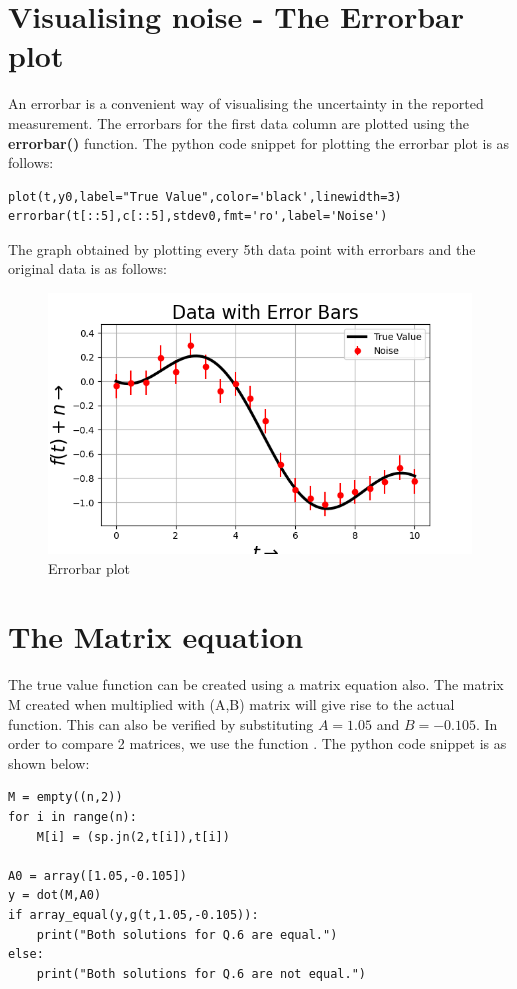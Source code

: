 \documentclass[11pt, a4paper]{article}
\begin{document}
\section{Visualising noise - The Errorbar plot}
An errorbar is a convenient way of visualising the uncertainty in the reported measurement. The errorbars for the first data column are plotted using the \textbf{errorbar()} function. The python code snippet for plotting the errorbar plot is as follows:
\begin{verbatim}	
plot(t,y0,label="True Value",color='black',linewidth=3)
errorbar(t[::5],c[::5],stdev0,fmt='ro',label='Noise')
\end{verbatim}
 The graph obtained by plotting every 5th data point with errorbars and the original data is as follows:   
	\begin{figure}[!tbh]
   	\centering
   	\includegraphics[scale=0.6]{Figure_1.png}   
   	\caption{Errorbar plot}
   	\label{fig:sample}
   \end{figure} 
  
\section{The Matrix equation}
The true value function can be created using a matrix equation also. The matrix M created when multiplied with (A,B) matrix will give rise to the actual function. This can also be verified by substituting $A=1.05$ and $B=-0.105$. In order to compare 2 matrices, we use the function . The python code snippet is as shown below:
  \begin{verbatim}	
M = empty((n,2))
for i in range(n):
	M[i] = (sp.jn(2,t[i]),t[i])
	
A0 = array([1.05,-0.105])
y = dot(M,A0)
if array_equal(y,g(t,1.05,-0.105)):
	print("Both solutions for Q.6 are equal.")
else:
	print("Both solutions for Q.6 are not equal.")	
\end{verbatim} 
\end{document}
